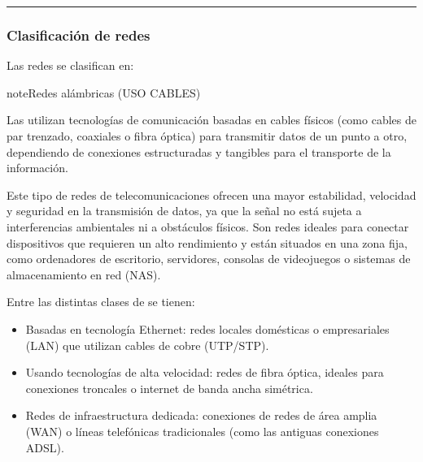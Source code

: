\documentclass[letterpaper,10pt,spanish]{sphinxmanual}
\begin{document}
\bigskip\hrule\bigskip



\subsubsection{Clasificación de redes}
\label{\detokenize{1_guias/10informatica/G1003:clasificacion-de-redes}}
\sphinxAtStartPar
Las redes se clasifican en:

\begin{sphinxadmonition}{note}{Redes alámbricas (USO CABLES)}

\sphinxAtStartPar
Las  utilizan tecnologías de comunicación basadas en cables físicos (como cables de par trenzado, coaxiales o fibra óptica) para transmitir datos de un punto a otro, dependiendo de conexiones estructuradas y tangibles para el transporte de la información.

\sphinxAtStartPar
Este tipo de redes de telecomunicaciones ofrecen una mayor estabilidad, velocidad y seguridad en la transmisión de datos, ya que la señal no está sujeta a interferencias ambientales ni a obstáculos físicos. Son redes ideales para conectar dispositivos que requieren un alto rendimiento y están situados en una zona fija, como ordenadores de escritorio, servidores, consolas de videojuegos o sistemas de almacenamiento en red (NAS).

\sphinxAtStartPar
Entre las distintas clases de  se tienen:
\begin{itemize}
\item {} 
\sphinxAtStartPar
Basadas en tecnología Ethernet: redes locales domésticas o empresariales (LAN) que utilizan cables de cobre (UTP/STP).

\item {} 
\sphinxAtStartPar
Usando tecnologías de alta velocidad: redes de fibra óptica, ideales para conexiones troncales o internet de banda ancha simétrica.

\item {} 
\sphinxAtStartPar
Redes de infraestructura dedicada: conexiones de redes de área amplia (WAN) o líneas telefónicas tradicionales (como las antiguas conexiones ADSL).

\end{itemize}
\end{sphinxadmonition}
\end{document}
